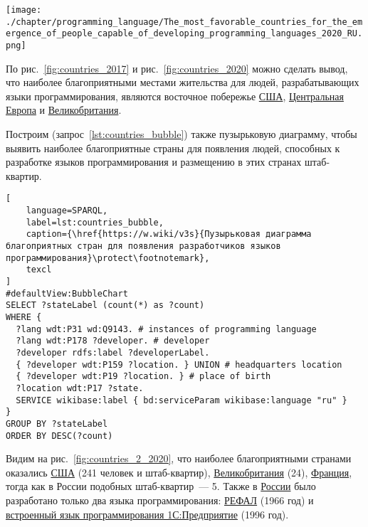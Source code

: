\begin{marginfigure}
\texttt{[image: ./chapter/programming\_language/The\_most\_favorable\_countries\_for\_the\_emergence\_of\_people\_capable\_of\_developing\_programming\_languages\_2020\_RU.png]}
  \caption[Наиболее благоприятные страны для появления людей, способных к разработке языков программирования, 2020 год.]{Наиболее благоприятные страны для появления людей, способных к разработке языков программирования, 2020 год. Размер пузырька соответствует числу людей, причастных к разработке языков программирования, из соответствующей страны. Ссылка на SPARQL-запрос: \href{https://w.wiki/v3s}{https://w.wiki/v3s}}%
  \label{fig:countries_2_2020}%
\end{marginfigure}
По рис.~\ref{fig:countries_2017} и рис.~\ref{fig:countries_2020} можно сделать вывод, что наиболее благоприятными местами жительства для людей, разрабатывающих языки программирования, являются восточное побережье \href{https://en.wikipedia.org/wiki/USA}{США}, \href{https://ru.wikipedia.org/wiki/Центральная_Европа}{Центральная Европа} и \href{https://ru.wikipedia.org/wiki/Великобритания}{Великобритания}.

Построим (запрос~\ref{lst:countries_bubble}) также пузырьковую диаграмму, чтобы выявить наиболее благоприятные страны для появления людей, способных к разработке языков программирования и размещению в этих странах штаб-квартир. 
\begin{lstlisting}[
	language=SPARQL,
	label=lst:countries_bubble,
	caption={\href{https://w.wiki/v3s}{Пузырьковая диаграмма благоприятных стран для появления разработчиков языков программирования}\protect\footnotemark},
	texcl
]
#defaultView:BubbleChart
SELECT ?stateLabel (count(*) as ?count)
WHERE {
  ?lang wdt:P31 wd:Q9143. # instances of programming language
  ?lang wdt:P178 ?developer. # developer
  ?developer rdfs:label ?developerLabel. 
  { ?developer wdt:P159 ?location. } UNION # headquarters location
  { ?developer wdt:P19 ?location. } # place of birth
  ?location wdt:P17 ?state.
  SERVICE wikibase:label { bd:serviceParam wikibase:language "ru" } 	
}
GROUP BY ?stateLabel
ORDER BY DESC(?count)
\end{lstlisting}

Видим на рис.~\ref{fig:countries_2_2020}, что наиболее благоприятными странами оказались \href{https://en.wikipedia.org/wiki/USA}{США} (241 человек и штаб-квартир), \href{https://ru.wikipedia.org/wiki/Великобритания}{Великобритания} (24), \href{https://ru.wikipedia.org/wiki/Франция}{Франция}, тогда как в России подобных штаб-квартир~--- 5. Также в \href{https://en.wikipedia.org/wiki/Russia}{России} было разработано только два языка программирования: \href{https://www.wikidata.org/wiki/Q2626418}{РЕФАЛ} (1966 год) и \href{https://www.wikidata.org/wiki/Q65065977}{встроенный язык программирования 1С:Предприятие} (1996 год).

